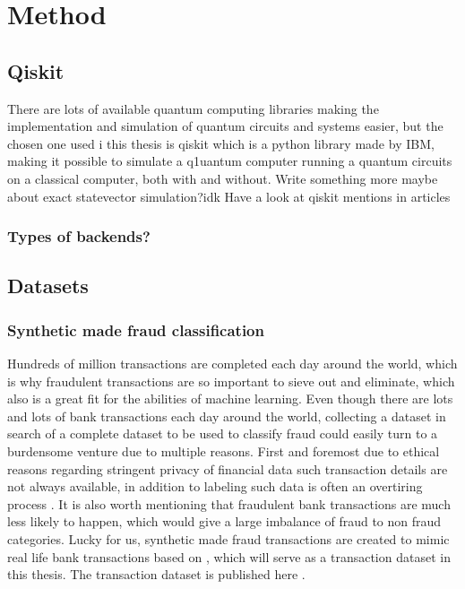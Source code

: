 \documentclass[../main.tex]{subfiles}
\begin{document}
\chapter{Method}
\label{sec:sixth}

\section{Qiskit}
There are lots of available quantum computing libraries making the implementation and simulation of quantum circuits and systems easier, but the chosen one used i this thesis is qiskit\cite{Qiskit_book} which is a python library made by IBM, making it possible to simulate a q1uantum computer running a quantum circuits on a classical computer, both with and without. Write something more maybe about exact statevector simulation?idk Have a look at qiskit mentions in articles

\subsection{Types of backends?}

\section{Datasets}
\subsection{Synthetic made fraud classification}
Hundreds of million transactions are completed each day around the world, which is why fraudulent transactions are so important to sieve out and eliminate, which also is a great fit for the abilities of machine learning. Even though there are lots and lots of bank transactions each day around the world, collecting a dataset in search of a complete dataset to be used to classify fraud could easily turn to a burdensome venture due to multiple reasons. First and foremost due to ethical reasons regarding stringent privacy of financial data such transaction details are not always available, in addition to labeling such data is often an overtiring process \cite{atman}. It is also worth mentioning that fraudulent bank transactions are much less likely to happen, which would give a large imbalance of fraud to non fraud categories. Lucky for us, synthetic made fraud transactions are created to mimic real life bank transactions based on \cite{atman}, which will serve as a transaction dataset in this thesis. The transaction dataset is published here \cite{padhi2021tabular}.
\end{document}
